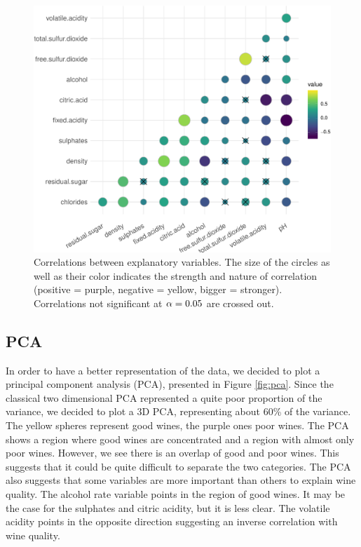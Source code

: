 \documentclass[11pt,]{article}
\begin{document}
\begin{figure}

{\centering \includegraphics[width=0.75\linewidth]{./figures/correlations-1} 

}

\caption{Correlations between explanatory variables. The size of the circles as well as their color indicates the strength and nature of correlation (positive = purple, negative = yellow, bigger = stronger). Correlations not significant at $\protect\alpha = 0.05$ are crossed out.}\label{fig:correlations}
\end{figure}

\hypertarget{pca}{%
\subsection{PCA}\label{pca}}

In order to have a better representation of the data, we decided to plot
a principal component analysis (PCA), presented in Figure \ref{fig:pca}.
Since the classical two dimensional PCA represented a quite poor
proportion of the variance, we decided to plot a 3D PCA, representing
about 60\% of the variance. The yellow spheres represent good wines, the
purple ones poor wines. The PCA shows a region where good wines are
concentrated and a region with almost only poor wines. However, we see
there is an overlap of good and poor wines. This suggests that it could
be quite difficult to separate the two categories. The PCA also suggests
that some variables are more important than others to explain wine
quality. The alcohol rate variable points in the region of good wines.
It may be the case for the sulphates and citric acidity, but it is less
clear. The volatile acidity points in the opposite direction suggesting
an inverse correlation with wine quality.
\end{document}
